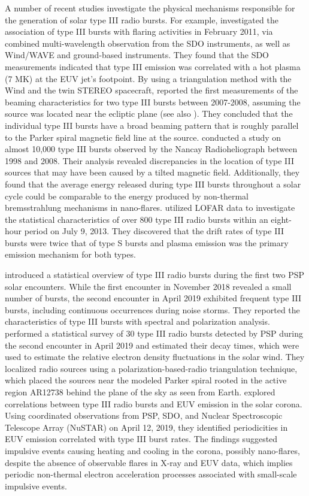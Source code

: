 A number of recent studies investigate the physical mechanisms responsible for the generation of solar type III radio bursts. For example, \cite{chen_2013b} investigated the association of type III bursts with flaring activities in February 2011, via combined multi-wavelength observation from the SDO instruments, as well as Wind/WAVE and ground-based instruments. They found that the SDO measurements indicated that type III emission was correlated with a hot plasma (7 MK) at the EUV jet's footpoint. 
By using a triangulation method with the Wind and the twin STEREO spacecraft, \cite{bonnin_2008} reported the first measurements of the beaming characteristics for two type III bursts between 2007-2008, assuming the source was located near the ecliptic plane (see also \cite{reiner_2009}). They concluded that the individual type III bursts have a broad beaming pattern that is roughly parallel to the Parker spiral magnetic field line at the source.
\cite{saint_2012} conducted a study on almost 10,000 type III bursts observed by the Nancay Radioheliograph between 1998 and 2008. Their analysis revealed discrepancies in the location of type III sources that may have been caused by a tilted magnetic field. Additionally, they found that the average energy released during type III bursts throughout a solar cycle could be comparable to the energy produced by non-thermal bremsstrahlung mechanisms in nano-flares.
\cite{morosan_2017} utilized LOFAR data to investigate the statistical characteristics of over 800 type III radio bursts within an eight-hour period on July 9, 2013. They discovered that the drift rates of type III bursts were twice that of type S bursts and plasma emission was the primary emission mechanism for both types.

\cite{pulupa_2020} introduced a statistical overview of type III radio bursts during the first two PSP solar encounters. While the first encounter in November 2018 revealed a small number of bursts, the second encounter in April 2019 exhibited frequent type III bursts, including continuous occurrences during noise storms. They reported the characteristics of type III bursts with spectral and polarization analysis.
\cite{krupar_2020} performed a statistical survey of 30 type III radio bursts detected by PSP during the second encounter in April 2019 and estimated their decay times, which were used to estimate the relative electron density fluctuations in the solar wind. They localized radio sources using a polarization-based-radio triangulation technique, which placed the sources near the modeled Parker spiral rooted in the active region AR12738 behind the plane of the sky as seen from Earth.
\cite{cattell_2021} explored correlations between type III radio bursts and EUV emission in the solar corona. Using coordinated observations from PSP, SDO, and Nuclear Spectroscopic Telescope Array (NuSTAR) on April 12, 2019, they identified periodicities in EUV emission correlated with type III burst rates. The findings suggested impulsive events causing heating and cooling in the corona, possibly nano-flares, despite the absence of observable flares in X-ray and EUV data, which implies periodic non-thermal electron acceleration processes associated with small-scale impulsive events.

